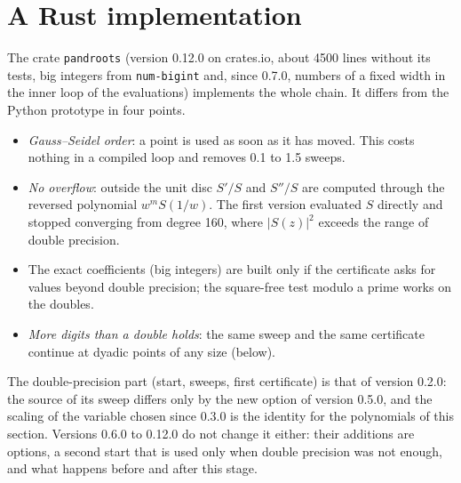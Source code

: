 \documentclass[10pt,a4paper]{article}
\theoremstyle{definition}
\numberwithin{equation}{section}
\begin{document}
\section{A Rust implementation}\label{sec:rust}
The crate \texttt{pandroots} (version 0.12.0 on crates.io, about 4500 lines without its tests, big
integers from \texttt{num-bigint} and, since 0.7.0, numbers of a fixed width in the inner loop of the
evaluations) implements the whole chain. It differs from the Python prototype in
four points.
\begin{itemize}
\item \emph{Gauss--Seidel order}: a point is used as soon as it has moved. This costs nothing in a
 compiled loop and removes 0.1 to 1.5 sweeps.
\item \emph{No overflow}: outside the unit disc $S'/S$ and $S''/S$ are computed through the reversed
 polynomial $w^mS(1/w)$. The first version evaluated $S$ directly and stopped converging from degree
 160, where $|S(z)|^2$ exceeds the range of double precision.
\item The exact coefficients (big integers) are built only if the certificate asks for values beyond
 double precision; the square-free test modulo a prime works on the doubles.
\item \emph{More digits than a double holds}: the same sweep and the same certificate continue at
 dyadic points of any size (below).
\end{itemize}
The double-precision part (start, sweeps, first certificate) is that of version 0.2.0: the source of
its sweep differs only by the new option of version 0.5.0, and the scaling of the variable chosen
since 0.3.0 is the identity for the polynomials of this section. Versions 0.6.0 to 0.12.0 do not
change it either: their additions are options, a second start that is used only when double precision
was not enough, and what happens before and after this stage.
\end{document}
